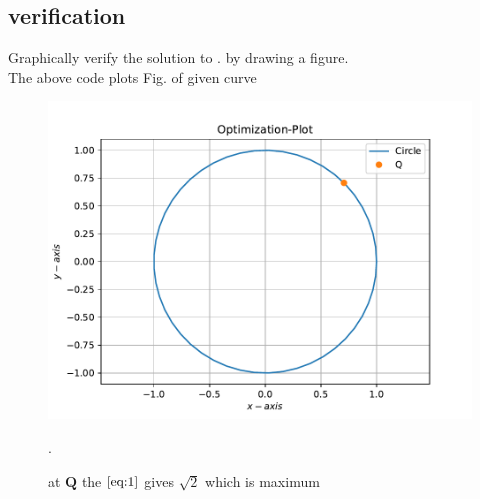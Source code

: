 \documentclass[journal,10pt,twocolumn]{article}
\let\vec\mathbf
\let\vec\mathbf
\begin{document}
\subsection{verification} Graphically verify the solution to . 
by drawing a figure.
\\
The above code plots Fig. of given curve
%	

%
\begin{figure}[!ht]
\centering
\includegraphics[width=\columnwidth]{fig/cvxoptfig.pdf}
\caption{ at $\vec{Q}$ the $\eqref{eq:1}$ gives $\sqrt{2}$ which is maximum }.
\label{fig:qp_parab}
\end{figure}

\end{document}
